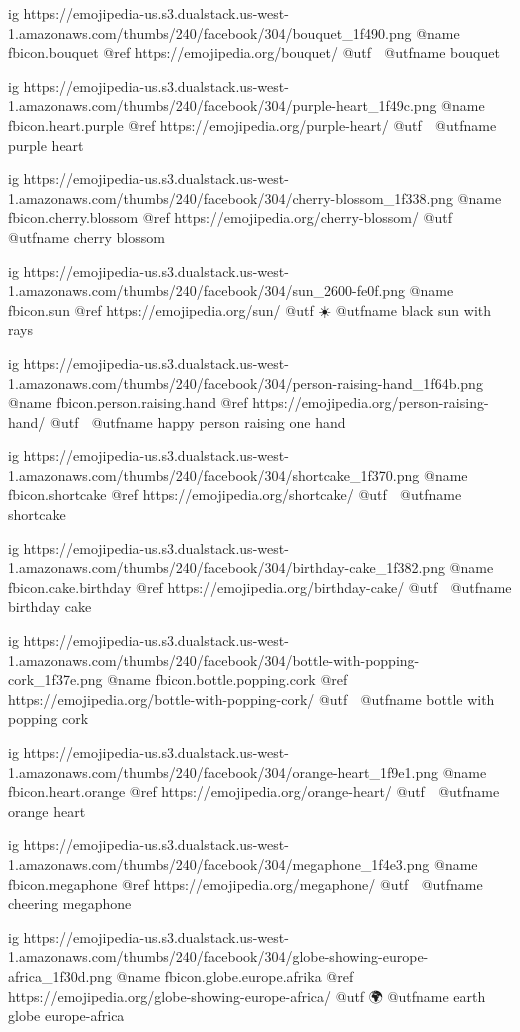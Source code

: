 	ig https://emojipedia-us.s3.dualstack.us-west-1.amazonaws.com/thumbs/240/facebook/304/bouquet_1f490.png
	@name fbicon.bouquet
	@ref https://emojipedia.org/bouquet/
	@utf 💐
	@utfname bouquet

	ig https://emojipedia-us.s3.dualstack.us-west-1.amazonaws.com/thumbs/240/facebook/304/purple-heart_1f49c.png
	@name fbicon.heart.purple
	@ref https://emojipedia.org/purple-heart/
	@utf 💜
	@utfname purple heart

	ig https://emojipedia-us.s3.dualstack.us-west-1.amazonaws.com/thumbs/240/facebook/304/cherry-blossom_1f338.png
	@name fbicon.cherry.blossom
	@ref https://emojipedia.org/cherry-blossom/
	@utf 🌸
	@utfname cherry blossom

	ig https://emojipedia-us.s3.dualstack.us-west-1.amazonaws.com/thumbs/240/facebook/304/sun_2600-fe0f.png
	@name fbicon.sun
	@ref https://emojipedia.org/sun/
	@utf ☀️
	@utfname black sun with rays

	ig https://emojipedia-us.s3.dualstack.us-west-1.amazonaws.com/thumbs/240/facebook/304/person-raising-hand_1f64b.png
	@name fbicon.person.raising.hand
	@ref https://emojipedia.org/person-raising-hand/
	@utf 🙋
	@utfname happy person raising one hand

	ig https://emojipedia-us.s3.dualstack.us-west-1.amazonaws.com/thumbs/240/facebook/304/shortcake_1f370.png
	@name fbicon.shortcake
	@ref https://emojipedia.org/shortcake/
	@utf 🍰
	@utfname shortcake

	ig https://emojipedia-us.s3.dualstack.us-west-1.amazonaws.com/thumbs/240/facebook/304/birthday-cake_1f382.png
	@name fbicon.cake.birthday
	@ref https://emojipedia.org/birthday-cake/
	@utf 🎂
	@utfname birthday cake

	ig https://emojipedia-us.s3.dualstack.us-west-1.amazonaws.com/thumbs/240/facebook/304/bottle-with-popping-cork_1f37e.png
	@name fbicon.bottle.popping.cork
	@ref https://emojipedia.org/bottle-with-popping-cork/
	@utf 🍾
	@utfname bottle with popping cork

	ig https://emojipedia-us.s3.dualstack.us-west-1.amazonaws.com/thumbs/240/facebook/304/orange-heart_1f9e1.png
	@name fbicon.heart.orange
	@ref https://emojipedia.org/orange-heart/
	@utf 🧡
	@utfname orange heart

	ig https://emojipedia-us.s3.dualstack.us-west-1.amazonaws.com/thumbs/240/facebook/304/megaphone_1f4e3.png
	@name fbicon.megaphone
	@ref https://emojipedia.org/megaphone/
	@utf 📣
	@utfname cheering megaphone

	ig https://emojipedia-us.s3.dualstack.us-west-1.amazonaws.com/thumbs/240/facebook/304/globe-showing-europe-africa_1f30d.png
	@name fbicon.globe.europe.afrika
	@ref https://emojipedia.org/globe-showing-europe-africa/
	@utf 🌍
	@utfname earth globe europe-africa

